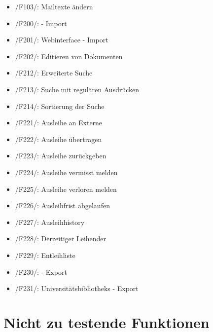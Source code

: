 
\begin{itemize}
\item /F103/: Mailtexte ändern
\item /F200/: \BibTex - Import %
\item /F201/: Webinterface - Import
\item /F202/: Editieren von Dokumenten
\item /F212/: Erweiterte Suche %
\item /F213/: Suche mit regulären Ausdrücken %
\item /F214/: Sortierung der Suche %
\item /F221/: Ausleihe an Externe %
\item /F222/: Ausleihe übertragen %
\item /F223/: Ausleihe zurückgeben %
\item /F224/: Ausleihe vermisst melden
\item /F225/: Ausleihe verloren melden
\item /F226/: Ausleihfrist abgelaufen
\item /F227/: Ausleihhistory
\item /F228/: Derzeitiger Leihender %
\item /F229/: Entleihliste %
\item /F230/: \BibTex - Export %
\item /F231/: Universitätsbibliotheks - Export
\end{itemize}

\section{Nicht zu testende Funktionen}



